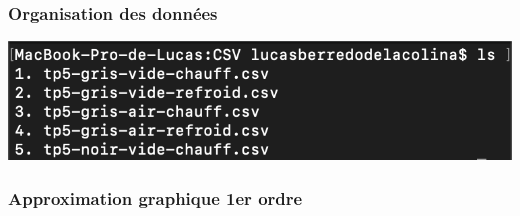 \documentclass{beamer}
\begin{document}
\begin{frame}
\frametitle{Organisation des données}

\centering
\begin{minipage}{0.48\textwidth}
    \centering
    \includegraphics[width=\linewidth]{Fig/ls-csv.png}
\end{minipage}
\hfill
\begin{minipage}{0.48\textwidth}
    \centering
\end{minipage}
\end{frame}





\begin{frame}
\frametitle{Approximation graphique 1er ordre}


\end{frame}
\end{document}
